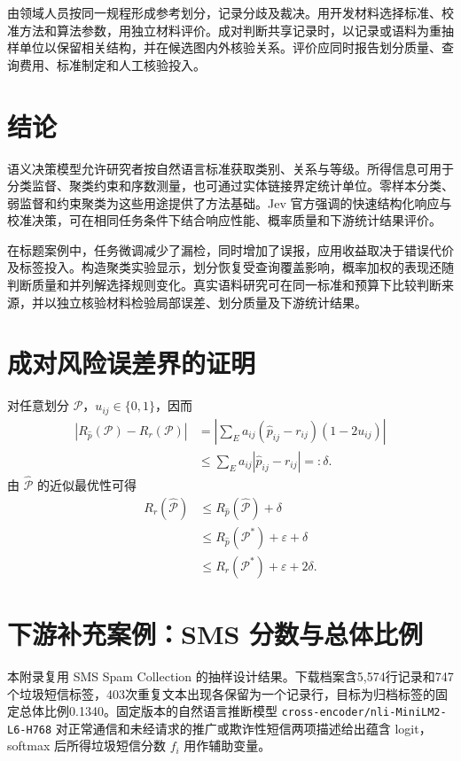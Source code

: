 \documentclass[UTF8,a4paper,zihao=-4,fontset=fandol]{ctexart}
\begin{document}
由领域人员按同一规程形成参考划分，记录分歧及裁决。用开发材料选择标准、校准方法和算法参数，用独立材料评价。成对判断共享记录时，以记录或语料为重抽样单位以保留相关结构，并在候选图内外核验关系。评价应同时报告划分质量、查询费用、标准制定和人工核验投入。

\section{结论}\label{sec:conclusion}

语义决策模型允许研究者按自然语言标准获取类别、关系与等级。所得信息可用于分类监督、聚类约束和序数测量，也可通过实体链接界定统计单位。零样本分类、弱监督和约束聚类为这些用途提供了方法基础。Jev 官方强调的快速结构化响应与校准决策，可在相同任务条件下结合响应性能、概率质量和下游统计结果评价。

在标题案例中，任务微调减少了漏检，同时增加了误报，应用收益取决于错误代价及标签投入。构造聚类实验显示，划分恢复受查询覆盖影响，概率加权的表现还随判断质量和并列解选择规则变化。真实语料研究可在同一标准和预算下比较判断来源，并以独立核验材料检验局部误差、划分质量及下游统计结果。

\appendix
\section{成对风险误差界的证明}\label{app:bound}

对任意划分 $\mathcal P$，$u_{ij}\in\{0,1\}$，因而
\begin{align}
 |R_{\widehat p}(\mathcal P)-R_r(\mathcal P)|
 &=\left|\sum_E a_{ij}(\widehat p_{ij}-r_{ij})(1-2u_{ij})\right|\\
 &\leq\sum_E a_{ij}|\widehat p_{ij}-r_{ij}|=:\delta.
\end{align}
由 $\widehat{\mathcal P}$ 的近似最优性可得
\begin{align}
 R_r(\widehat{\mathcal P})
 &\leq R_{\widehat p}(\widehat{\mathcal P})+\delta\\
 &\leq R_{\widehat p}(\mathcal P^*)+\varepsilon+\delta\\
 &\leq R_r(\mathcal P^*)+\varepsilon+2\delta.
\end{align}

\section{下游补充案例：SMS 分数与总体比例}\label{sec:sms}

本附录复用 SMS Spam Collection 的抽样设计结果\citep{sms-data}。下载档案含5,574行记录和747个垃圾短信标签，403次重复文本出现各保留为一个记录行，目标为归档标签的固定总体比例0.1340。固定版本的自然语言推断模型 \nolinkurl{cross-encoder/nli-MiniLM2-L6-H768} 对正常通信和未经请求的推广或欺诈性短信两项描述给出蕴含 logit，softmax 后所得垃圾短信分数 $f_i$ 用作辅助变量\citep{sms-model}。
\end{document}
